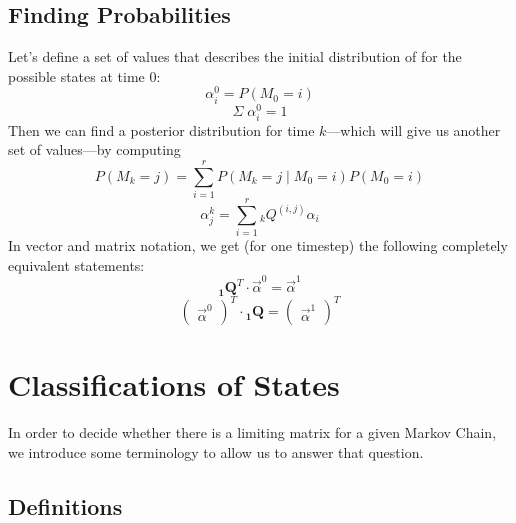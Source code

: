 \documentclass[a4paper,12pt]{scrartcl}
\begin{document}
\subsection{Finding Probabilities}

Let's define a set of values that describes the initial distribution of 
for the possible states at time $0$:
   \[ \alpha_i^0 = P(M_0 = i) \]
   \[\Sigma\; \alpha_i^0 = 1 \]
Then we can find a posterior distribution for time $k$---which will
give us another set of values---by computing
   \[ P(M_k = j) = \sum^r_{i=1} P(M_k = j \;|\; M_0 = i) P(M_0 = i) \]
   \[ \alpha_j^k = \sum_{i=1}^r {}_kQ^{(i,j)} \alpha_i \]
In vector and matrix notation, we get (for one timestep) the following
completely equivalent statements:
   \[ \mathbf{{}_{1}Q}^T \cdot \vec{\alpha}^0 = \vec{\alpha}^1 \]
   \[ \begin{pmatrix}\vec{\alpha}^0\end{pmatrix}^T \cdot\mathbf{{}_{1}Q}
      =\begin{pmatrix}\vec{\alpha}^1\end{pmatrix}^T\]

\section{Classifications of States}

In order to decide whether there is a limiting matrix for a given 
Markov Chain, we introduce some terminology to allow us to answer that
question.

\subsection{Definitions}
\end{document}
